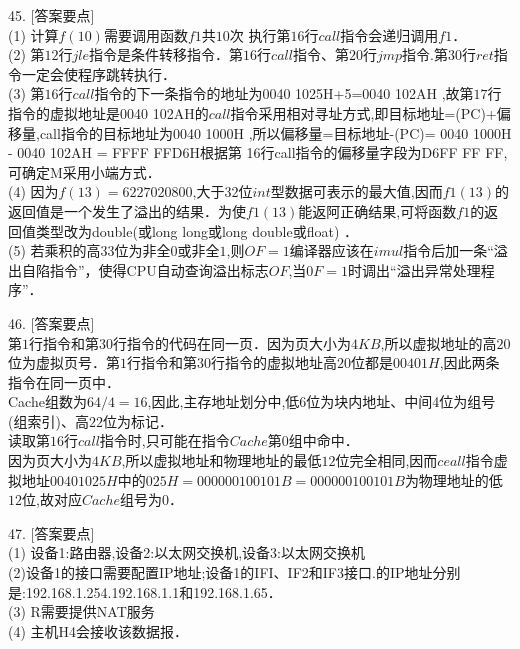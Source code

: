45. [答案要点] \\
(1) 计算$f(10)$需要调用函数$f1$共$10$次 执行第$16$行$call$指令会递归调用$f1$． \\
(2) 第$12$行$jle$指令是条件转移指令．第$16$行$call$指令、第$20$行$jmp$指令.第$30$行$ret$指令一定会使程序跳转执行． \\
(3) 第$16$行$call$指令的下一条指令的地址为0040 1025H+5=0040 102AH ,故第$17$行指令的虚拟地址是0040 102AH的$call$指令采用相对寻址方式,即目标地址=(PC)+偏移量,call指令的目标地址为0040 1000H ,所以偏移量=目标地址-(PC)= 0040 1000H - 0040 102AH = FFFF FFD6H根据第 16行call指令的偏移量字段为D6FF FF FF,可确定M采用小端方式． \\
(4) 因为$f(13) = 6 227020 800$,大于$32$位$int$型数据可表示的最大值,因而$f1(13)$的返回值是一个发生了溢出的结果．为使$f1(13)$能返阿正确结果,可将函数$f1$的返回值类型改为double(或long long或long double或float) ． \\
(5) 若乘积的高$33$位为非全$0$或非全$1$,则$OF=1$编译器应该在$imul$指令后加一条“溢出自陷指令”，使得CPU自动查询溢出标志$OF$,当$0F=1$时调出“溢出异常处理程序”．

46. [答案要点] \\
第$1$行指令和第$30$行指令的代码在同一页．因为页大小为$4 KB$,所以虚拟地址的高$20$位为虚拟页号．第$1$行指令和第$30$行指令的虚拟地址高$20$位都是$00401H$,因此两条指令在同一页中． \\
Cache组数为$64/4=16$,因此,主存地址划分中,低$6$位为块内地址、中间4位为组号(组索引)、高$22$位为标记． \\
读取第$16$行$call$指令时,只可能在指令$Cache$第$0$组中命中． \\
因为页大小为$4KB$,所以虚拟地址和物理地址的最低$12$位完全相同,因而$ceall$指令虚拟地址$00401025H$中的$025H=000000100101B=000000100101B$为物理地址的低$12$位,故对应$Cache$组号为$0$．

47. [答案要点] \\
(1) 设备1:路由器,设备2:以太网交换机,设备3:以太网交换机 \\
(2)设备1的接口需要配置IP地址;设备1的IFI、IF2和IF3接口.的IP地址分别是:192.168.1.254.192.168.1.1和192.168.1.65． \\
(3) R需要提供NAT服务 \\
(4) 主机H4会接收该数据报．